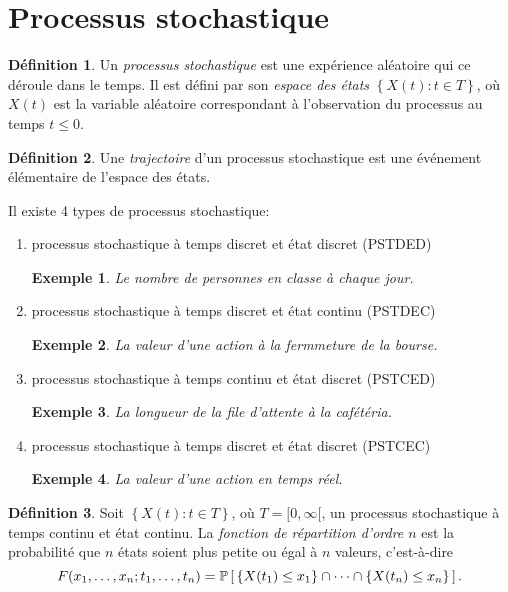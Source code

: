 \documentclass[11pt]{article}
\makeatletter
\renewcommand\P[1]{%
	\ensuremath{%
		\mathbb{P}\left[\,#1\,\right]%
	}%
}%
\newtheorem*{exemple*}{Exemple}
\theoremstyle{remark}
\theoremstyle{definition}
\newtheorem*{@definition}{Définition}
\newenvironment{definition}{%
	\begin{@definition}%
}{%
	\end{@definition}%
	\setcounter{property}{0}%
}
\makeatother
\begin{document}
\pagebreak
\section{Processus stochastique}
\begin{definition}
	Un \textit{processus stochastique} est une expérience aléatoire qui ce
	déroule dans le temps. Il est défini par son \textit{espace des états}
	$\left\{X(t):t\in T\right\}$, où $X(t)$ est la variable aléatoire
	correspondant à l'observation du processus au temps $t\leq 0$.
\end{definition}

\begin{definition}
	Une \textit{trajectoire} d'un processus stochastique est une événement
	élémentaire de l'espace des états.
\end{definition}

Il existe 4 types de processus stochastique:
\begin{enumerate}
	\item processus stochastique à temps discret et état discret (PSTDED)
	\begin{exemple*}
		Le nombre de personnes en classe à chaque jour.
	\end{exemple*}
	\item processus stochastique à temps discret et état continu (PSTDEC)
	\begin{exemple*}
		La valeur d'une action à la fermmeture de la bourse.
	\end{exemple*}
	\item processus stochastique à temps continu et état discret (PSTCED)
	\begin{exemple*}
		La longueur de la file d'attente à la cafétéria.
	\end{exemple*}
	\item processus stochastique à temps discret et état discret (PSTCEC)
	\begin{exemple*}
		La valeur d'une action en temps réel.
	\end{exemple*}
\end{enumerate}

\begin{definition}
	Soit $\left\{X(t):t\in T\right\}$, où $T=[0,\infty[$, un processus
	stochastique à temps continu et état continu. La \textit{fonction de
	répartition d'ordre $n$} est la probabilité que $n$ états soient plus
	petite ou égal à $n$ valeurs, c'est-à-dire
	\begin{equation*}
		F(x_1,\dots,x_n;t_1,\dots,t_n)
		=\P{\left\{X(t_1)\leq x_1\right\}
		 \cap\cdots\cap
		 \left\{X(t_n)\leq x_n\right\}}.
	\end{equation*}
\end{definition}
\end{document}
